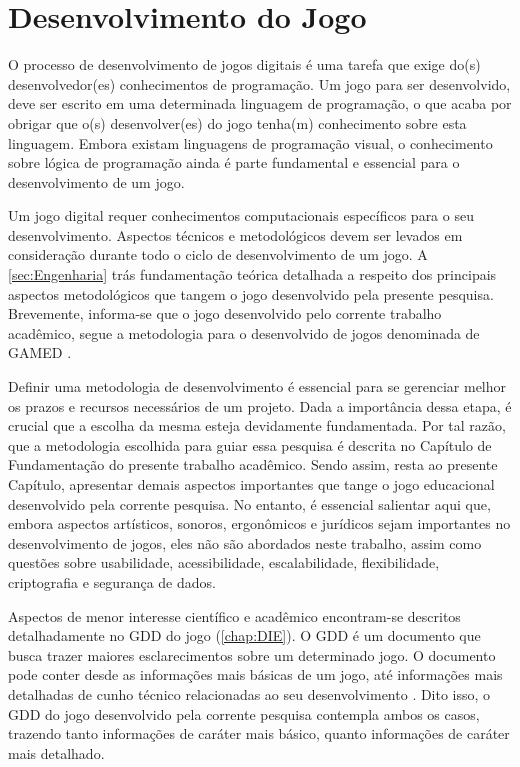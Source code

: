 \chapter{Desenvolvimento do Jogo}\label{ch:Desenvolvimento}

O processo de desenvolvimento de jogos digitais é uma tarefa que exige do(s) desenvolvedor(es) conhecimentos de programação. Um jogo para ser desenvolvido, deve ser escrito em uma determinada linguagem de programação, o que acaba por obrigar que o(s) desenvolver(es) do jogo tenha(m) conhecimento sobre esta linguagem. Embora existam linguagens de programação visual, o conhecimento sobre lógica de programação ainda é parte fundamental e essencial para o desenvolvimento de um jogo. 

Um jogo digital requer conhecimentos computacionais específicos para o seu desenvolvimento. Aspectos técnicos e metodológicos devem ser levados em consideração durante todo o ciclo de desenvolvimento de um jogo. A \autoref{sec:Engenharia} trás fundamentação teórica detalhada a respeito dos principais aspectos metodológicos que tangem o jogo desenvolvido pela presente pesquisa. Brevemente, informa-se que o jogo desenvolvido pelo corrente trabalho acadêmico, segue a metodologia para o desenvolvido de jogos denominada de \ac{GAMED} \cite{aslan2016digital}. 

Definir uma metodologia de desenvolvimento é essencial para se gerenciar melhor os prazos e recursos necessários de um projeto. Dada a importância dessa etapa, é crucial que a escolha da mesma esteja devidamente fundamentada. Por tal razão, que a metodologia escolhida para guiar essa pesquisa é descrita no Capítulo de Fundamentação do presente trabalho acadêmico. Sendo assim, resta ao presente Capítulo, apresentar demais aspectos importantes que tange o jogo educacional desenvolvido pela corrente pesquisa. No entanto, é essencial salientar aqui que, embora aspectos artísticos, sonoros, ergonômicos e jurídicos sejam importantes no desenvolvimento de jogos, eles não são abordados neste trabalho, assim como questões sobre usabilidade, acessibilidade, escalabilidade, flexibilidade, criptografia e segurança de dados.

Aspectos de menor interesse científico e acadêmico encontram-se descritos detalhadamente no \ac{GDD} do jogo (\autoref{chap:DIE}). O \ac{GDD} é um documento que busca trazer maiores esclarecimentos sobre um determinado jogo. O documento pode conter desde as informações mais básicas de um jogo, até informações mais detalhadas de cunho técnico relacionadas ao seu desenvolvimento \cite{motta2013short}. Dito isso, o \ac{GDD} do jogo desenvolvido pela corrente pesquisa contempla ambos os casos, trazendo tanto informações de caráter mais básico, quanto informações de caráter mais detalhado.

